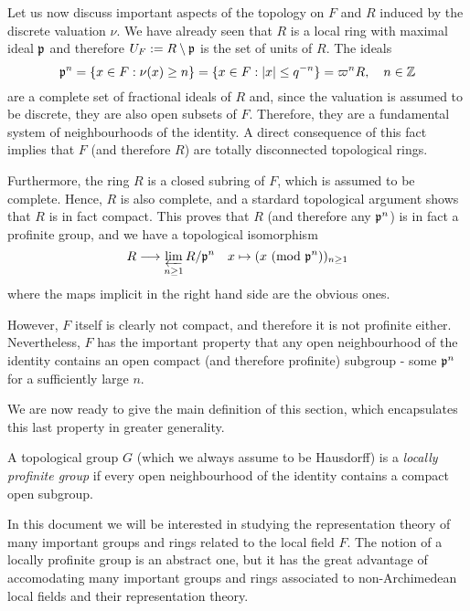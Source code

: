 Let us now discuss important aspects of the topology on $F$ and $R$ induced by the discrete valuation $\nu$. We have already seen that $R$ is a local ring with maximal ideal $\mathfrak{p}$ and therefore $U_F:=R\setminus\mathfrak{p}$ is the set of units of $R$. The ideals 
$$\mathfrak{p}^n=\{x\in F:\nu(x)\geq n\}=\{x\in F: |x|\leq q^{-n}\}=\varpi^n R,\quad n\in\mathbb{Z}$$
are a complete set of fractional ideals of $R$ and, since the valuation is assumed to be discrete, they are also open subsets of $F$.
Therefore, they are a fundamental system of neighbourhoods of the identity. A direct consequence of this fact implies that $F$ (and therefore $R$) are totally disconnected topological rings.

Furthermore, the ring $R$ is a closed subring of $F$, which is assumed to be complete. Hence, $R$ is also complete, and a stardard topological argument shows that $R$ is in fact compact. This proves that $R$ (and therefore any $\mathfrak{p}^n$) is in fact a profinite group, and we have a topological isomorphism 
$$R\longrightarrow\varprojlim_{n\geq 1} R/\mathfrak{p}^n\quad x\mapsto (x\ (\textrm{mod }{\mathfrak{p}^n}))_{n\geq 1}$$
where the maps implicit in the right hand side are the obvious ones.

However, $F$ itself is clearly not compact, and therefore it is not profinite either. Nevertheless, $F$ has the important property that any open neighbourhood of the identity contains an open compact (and therefore profinite) subgroup - some $\mathfrak{p}^n$ for a sufficiently large $n$.

We are now ready to give the main definition of this section, which encapsulates this last property in greater generality.

\begin{defn}\label{loc_prof_grp}
    A topological group $G$ (which we always assume to be Hausdorff) is a \textit{locally profinite group} if every open neighbourhood of the identity contains a compact open subgroup. 
\end{defn}

In this document we will be interested in studying the representation theory of many important groups and rings related to the local field $F$. The notion of a locally profinite group is an abstract one, but it has the great advantage of accomodating many important groups and rings associated to non-Archimedean local fields and their representation theory.

